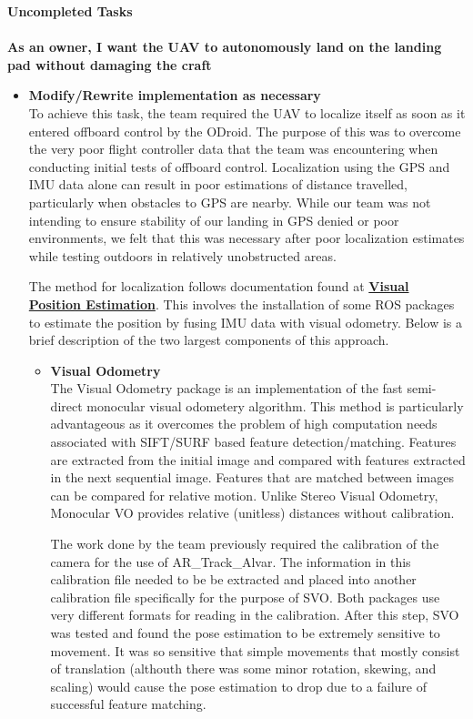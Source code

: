 \vspace{5mm}
\noindent \Large{\textbf{Uncompleted Tasks}}\\
\vspace{2mm}\\
\noindent \large{\textbf{As an owner, I want the UAV to autonomously land on the landing pad without damaging the craft}}
\normalsize
\begin{itemize}
\item \textbf{Modify/Rewrite implementation as necessary}\\
To achieve this task, the team required the UAV to localize itself as soon as it entered offboard control by the ODroid. The purpose of this was to overcome the very poor flight controller data that the team was encountering when conducting initial tests of offboard control. Localization using the GPS and IMU data alone can result in poor estimations of distance travelled, particularly when obstacles to GPS are nearby. While our team was not intending to ensure stability of our landing in GPS denied or poor environments, we felt that this was necessary after poor localization estimates while testing outdoors in relatively unobstructed areas.\par 
The method for localization follows documentation found at \href{https://pixhawk.org/dev/ros/visual_estimation}{\textbf{Visual Position Estimation}}. This involves the installation of some ROS packages to estimate the position by fusing IMU data with visual odometry. Below is a brief description of the two largest components of this approach.
\begin{itemize}
\item \textbf{Visual Odometry}\\
The Visual Odometry package is an implementation of the fast semi-direct monocular visual odometery algorithm. This method is particularly advantageous as it overcomes the problem of high computation needs associated with SIFT/SURF based feature detection/matching. Features are extracted from the initial image and compared with features extracted in the next sequential image. Features that are matched between images can be compared for relative motion. Unlike Stereo Visual Odometry, Monocular VO provides relative (unitless) distances without calibration.\par 
The work done by the team previously required the calibration of the camera for the use of AR\_Track\_Alvar. The information in this calibration file needed to be be extracted and placed into another calibration file specifically for the purpose of SVO. Both packages use very different formats for reading in the calibration. After this step, SVO was tested and found the pose estimation to be extremely sensitive to movement. It was so sensitive that simple movements that mostly consist of translation (althouth there was some minor rotation, skewing, and scaling) would cause the pose estimation to drop due to a failure of successful feature matching.\par 

\end{itemize}
\end{itemize}
